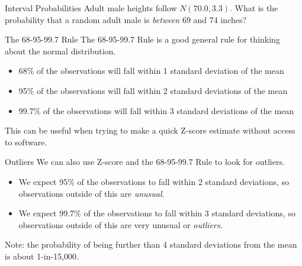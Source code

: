 \begin{frame}{Interval Probabilities}
    Adult male heights follow $N(70.0,3.3)$. What is the probability that a random adult male is \textit{between} 69 and 74 inches?
\end{frame}

\begin{frame}{The 68-95-99.7 Rule}
    The 68-95-99.7 Rule is a good general rule for thinking about the normal distribution.
    
    \begin{itemize}
        \item 68\% of the observations will fall within 1 standard deviation of the mean
        \item 95\% of the observations will fall within 2 standard deviations of the mean
        \item 99.7\% of the observations will fall within 3 standard deviations of the mean
    \end{itemize}
    This can be useful when trying to make a quick Z-score estimate without access to software.
\end{frame}

\begin{frame}{Outliers}
    We can also use Z-score and the 68-95-99.7 Rule to look for outliers.
    \begin{itemize}
        \item We expect 95\% of the observations to fall within 2 standard deviations, so observations outside of this are \textit{unusual}.
        \item We expect 99.7\% of the observations to fall within 3 standard deviations, so observations outside of this are very unusual or \textit{outliers}.
    \end{itemize}
    Note: the probability of being further than 4 standard deviations from the mean is about 1-in-15,000.
\end{frame}
